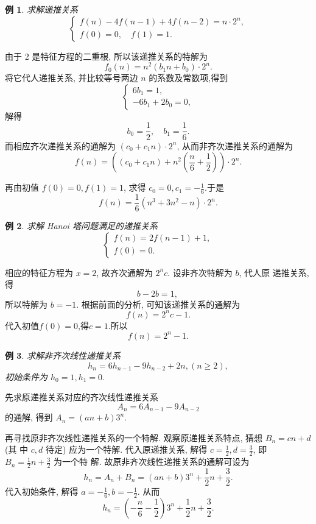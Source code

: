 \documentclass[punct]{ctexbeamer}
\newtheorem{ex}{例}[section]
\def\sol{\noindent {\bf 解\ }}
\begin{document}
\begin{frame}
	\begin{ex}
		求解递推关系
		$$
		\left\{\begin{array}{l}
			f(n)-4 f(n-1)+4 f(n-2)=n \cdot 2^n, \\
			f(0)=0, \quad f(1)=1 .
		\end{array}\right.
		$$
	\end{ex}
\pause\sol
 由于 2 是特征方程的二重根, 所以该递推关系的特解为
$$
f_0(n)=n^2\left(b_1 n+b_0\right) \cdot 2^n .
$$
将它代人递推关系, 并比较等号两边 $n$ 的系数及常数项,得到
$$
\left\{\begin{array}{l}
	6 b_1=1, \\
	-6 b_1+2 b_0=0,
\end{array}\right.
$$
解得
$$
b_0=\frac{1}{2}, \quad b_1=\frac{1}{6} .
$$
而相应齐次递推关系的通解为 $\left(c_0+c_1 n\right) \cdot 2^n$, 从而非齐次递推关系的通解为
$$
f(n)=\left( \left(c_0+c_1 n\right)+n^2\left(\frac{n}{6}+\frac{1}{2}\right) \right) \cdot 2^n .
$$

再由初值 $f(0)=0, f(1)=1$, 求得 $c_0=0, c_1=-\frac{1}{6}$.于是
$$
f(n)=\frac{1}{6}\left(n^3+3 n^2-n\right) \cdot 2^n .
$$
\end{frame}

\begin{frame}
	\begin{ex}
		求解 Hanoi 塔问题满足的递推关系
		$$
		\left\{\begin{array}{l}
			f(n)=2 f(n-1)+1, \\
			f(0)=0 .
		\end{array}\right.
		$$
	\end{ex}
\pause\sol
相应的特征方程为 $x=2$, 故齐次通解为 $2^n c$. 设非齐次特解为 $b$, 代人原 递推关系, 得
$$
b-2 b=1 \text {, }
$$
所以特解为 $b=-1$. 根据前面的分析, 可知该递推关系的通解为
$$f(n)=2^n c-1.$$
代入初值$f(0)=0$,得$c=1$.所以
$$
f(n)=2^n-1 .
$$
\end{frame}

\begin{frame}
\begin{ex}
求解非齐次线性递推关系
$$
h_n=6 h_{n-1}-9 h_{n-2}+2 n,(n \geq 2),
$$
初始条件为 $h_0=1, h_1=0$.
\end{ex}
\pause
\sol  先求原递推关系对应的齐次线性递推关系
$$
A_n=6 A_{n-1}-9 A_{n-2}
$$
的通解, 得到 $A_n=(a n+b) 3^n$.


再寻找原非齐次线性递推关系的一个特解. 观察原递推关系特点, 猜想 $B_n=c n+d$ (其 中 $c, d$ 待定) 应为一个特解. 代入原递推关系, 解得 $c=\frac{1}{2}, d=\frac{3}{2}$, 即 $B_n=\frac{1}{2} n+\frac{3}{2}$ 为一个特 解. 故原非齐次线性递推关系的通解可设为
$$
h_n=A_n+B_n=(a n+b) 3^n+\frac{1}{2} n+\frac{3}{2} .
$$
代入初始条件, 解得 $a=-\frac{1}{6}, b=-\frac{1}{2}$. 从而
$$
h_n=\left(-\frac{n}{6}-\frac{1}{2}\right) 3^n+\frac{1}{2} n+\frac{3}{2} .
$$

\end{frame}
\end{document}

